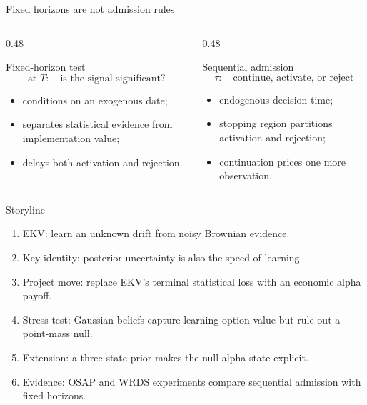 \documentclass[aspectratio=169,10pt]{beamer}
\newcommand{\1}{\mathbf{1}}
\begin{document}
\begin{frame}{Fixed horizons are not admission rules}
  \begin{columns}[T,onlytextwidth]
    \begin{column}{0.48\textwidth}
      \begin{block}{Fixed-horizon test}
        \[
          \text{at } T:\quad \text{is the signal significant?}
        \]
        \begin{itemize}
          \item conditions on an exogenous date;
          \item separates statistical evidence from implementation value;
          \item delays both activation and rejection.
        \end{itemize}
      \end{block}
    \end{column}
    \begin{column}{0.48\textwidth}
      \begin{block}{Sequential admission}
        \[
          \tau:\quad \text{continue, activate, or reject}
        \]
        \begin{itemize}
          \item endogenous decision time;
          \item stopping region partitions activation and rejection;
          \item continuation prices one more observation.
        \end{itemize}
      \end{block}
    \end{column}
  \end{columns}
\end{frame}

\begin{frame}{Storyline}
  \large
  \begin{enumerate}
    \item EKV: learn an unknown drift from noisy Brownian evidence.
    \item Key identity: posterior uncertainty is also the speed of learning.
    \item Project move: replace EKV's terminal statistical loss with an economic alpha payoff.
    \item Stress test: Gaussian beliefs capture learning option value but rule out a point-mass null.
    \item Extension: a three-state prior makes the null-alpha state explicit.
    \item Evidence: OSAP and WRDS experiments compare sequential admission with fixed horizons.
  \end{enumerate}
\end{frame}
\end{document}
